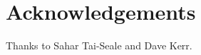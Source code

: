 \documentclass{aes137}
\begin{document}
\section{Acknowledgements}
Thanks to Sahar Tai-Seale and Dave Kerr.

%
%




%
%
\end{document}
